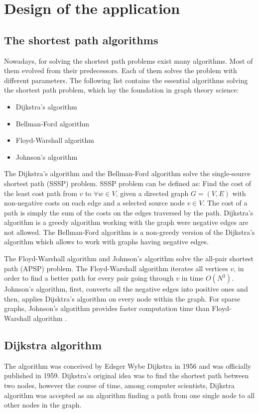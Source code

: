 \documentclass[thesis=M,english]{FITthesis}[2012/10/20]
\begin{document}
\chapter{Design of the application}
\label{ch:DOTA}

\section{The shortest path algorithms}
Nowadays, for solving the shortest path problems exist many algorithms. Most of them evolved from their predecessors. Each of them solves the problem with different parameters. 
The following list contains the essential algorithms solving the shortest path problem, which lay the foundation in graph theory science:
\begin{itemize}
\item Dijkstra's algorithm
\item Bellman-Ford algorithm
\item Floyd-Warshall algorithm
\item Johnson's algorithm 
\end{itemize}

The Dijkstra's algorithm \cite{Dijkstra59} and the Bellman-Ford algorithm \cite{Bellman58, FordFulkerson62} solve the single-source shortest path (SSSP) problem. SSSP problem can be defined as: Find the cost of the least cost path from $v$ to $\forall w \in V$, given a directed graph $G = (V,E)$ with non-negative costs on each edge and a selected source node $v \in V$. The cost of a path is simply the sum of the costs on the edges traversed by the path. Dijkstra's algorithm is a greedy algorithm working with the graph were negative edges are not allowed. The Bellman-Ford algorithm is a non-greedy version of the Dijkstra's algorithm which allows to work with graphs having negative edges.

The Floyd-Warshall algorithm \cite{Warshall62, Floyd56} and Johnson's algorithm \cite{Johnson77} solve the all-pair shortest path (APSP) problem. The Floyd-Warshall algorithm iterates all vertices $v$, in order to find a better path for every pair going through $v$ in time $O(N^3)$. Johnson's algorithm, first, converts all the negative edges into positive ones and then, applies Dijsktra's algorithm on every node within the graph. 
For sparse graphs, Johnson's algorithm provides faster computation time than Floyd-Warshall algorithm \cite{Cormen01}.


\section{Dijkstra algorithm}
\label{sec:dijsktra}
The algorithm was conceived by Edsger Wybe Dijkstra in 1956 and was officially published in 1959. Dijkstra's original idea was to find the shortest path between two nodes, however the course of time, among computer scientists, Dijkstra algorithm was accepted as an algorithm finding a path from one single node to all other nodes in the graph. 
\end{document}
